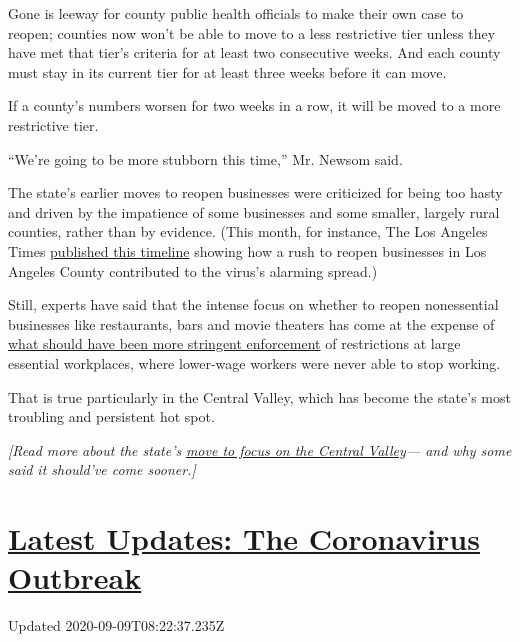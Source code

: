 Gone is leeway for county public health officials to make their own case
to reopen; counties now won't be able to move to a less restrictive tier
unless they have met that tier's criteria for at least two consecutive
weeks. And each county must stay in its current tier for at least three
weeks before it can move.

If a county's numbers worsen for two weeks in a row, it will be moved to
a more restrictive tier.

``We're going to be more stubborn this time,'' Mr. Newsom said.

The state's earlier moves to reopen businesses were criticized for being
too hasty and driven by the impatience of some businesses and some
smaller, largely rural counties, rather than by evidence. (This month,
for instance, The Los Angeles Times
\href{https://www.latimes.com/projects/how-rushed-la-reopening-sparked-covid-19-cases/}{published
this timeline} showing how a rush to reopen businesses in Los Angeles
County contributed to the virus's alarming spread.)

Still, experts have said that the intense focus on whether to reopen
nonessential businesses like restaurants, bars and movie theaters has
come at the expense of
\href{https://www.nytimes3xbfgragh.onion/2020/07/28/us/newsom-coronavirus-valley.html}{what
should have been more stringent enforcement} of restrictions at large
essential workplaces, where lower-wage workers were never able to stop
working.

That is true particularly in the Central Valley, which has become the
state's most troubling and persistent hot spot.

\emph{{[}Read more about the state's}
\href{https://www.nytimes3xbfgragh.onion/2020/07/28/us/newsom-coronavirus-valley.html}{\emph{move
to focus on the Central Valley}}\emph{--- and why some said it should've
come sooner.{]}}

\hypertarget{latest-updates-the-coronavirus-outbreak}{%
\section{\texorpdfstring{\href{https://www.nytimes3xbfgragh.onion/2020/09/08/world/covid-19-coronavirus.html?action=click\&pgtype=Article\&state=default\&region=MAIN_CONTENT_1\&context=storylines_live_updates}{Latest
Updates: The Coronavirus
Outbreak}}{Latest Updates: The Coronavirus Outbreak}}\label{latest-updates-the-coronavirus-outbreak}}

Updated 2020-09-09T08:22:37.235Z

